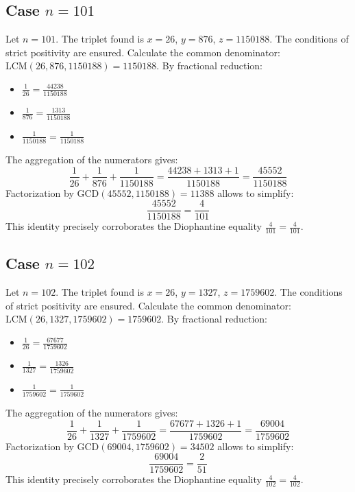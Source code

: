 \documentclass[11pt,a4paper]{article}
\begin{document}
\subsection{Case $n = 101$}
Let $n = 101$. The triplet found is $x = 26$, $y = 876$, $z = 1150188$.
The conditions of strict positivity are ensured.
Calculate the common denominator: $\text{LCM}(26, 876, 1150188) = 1150188$.
By fractional reduction:
\begin{itemize}
    \item $\frac{1}{26} = \frac{44238}{1150188}$
    \item $\frac{1}{876} = \frac{1313}{1150188}$
    \item $\frac{1}{1150188} = \frac{1}{1150188}$
\end{itemize}
The aggregation of the numerators gives:
$$ \frac{1}{26} + \frac{1}{876} + \frac{1}{1150188} = \frac{44238 + 1313 + 1}{1150188} = \frac{45552}{1150188} $$
Factorization by $\text{GCD}(45552, 1150188) = 11388$ allows to simplify:
$$ \frac{45552}{1150188} = \frac{4}{101} $$
This identity precisely corroborates the Diophantine equality $\frac{4}{101} = \frac{4}{101}$.

\subsection{Case $n = 102$}
Let $n = 102$. The triplet found is $x = 26$, $y = 1327$, $z = 1759602$.
The conditions of strict positivity are ensured.
Calculate the common denominator: $\text{LCM}(26, 1327, 1759602) = 1759602$.
By fractional reduction:
\begin{itemize}
    \item $\frac{1}{26} = \frac{67677}{1759602}$
    \item $\frac{1}{1327} = \frac{1326}{1759602}$
    \item $\frac{1}{1759602} = \frac{1}{1759602}$
\end{itemize}
The aggregation of the numerators gives:
$$ \frac{1}{26} + \frac{1}{1327} + \frac{1}{1759602} = \frac{67677 + 1326 + 1}{1759602} = \frac{69004}{1759602} $$
Factorization by $\text{GCD}(69004, 1759602) = 34502$ allows to simplify:
$$ \frac{69004}{1759602} = \frac{2}{51} $$
This identity precisely corroborates the Diophantine equality $\frac{4}{102} = \frac{4}{102}$.
\end{document}

